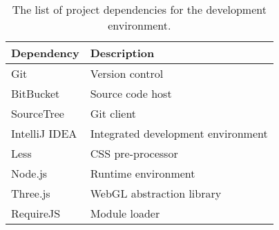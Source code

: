 
\begin{table}[H]
\caption[Development environment]{The list of project dependencies for the development environment.}
\label{tab:development_environment}
\begin{tabularx}{\textwidth}{@{}XX@{}}
	\toprule
	\textbf{Dependency} & \textbf{Description} \\
	\midrule
	Git & Version control \\
	BitBucket & Source code host \\
	SourceTree & Git client \\
	IntelliJ IDEA & Integrated development environment \\
	Less & CSS pre-processor \\
	Node.js & Runtime environment \\
	Three.js & WebGL abstraction library \\
	RequireJS & Module loader \\
	\bottomrule
\end{tabularx}
\end{table}